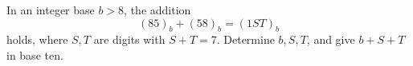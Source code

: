 In an integer base $b>8$, the addition
\[
(85)_b+(58)_b=(1ST)_b
\]
holds, where $S,T$ are digits with $S+T=7$. Determine $b,S,T$, and give $b+S+T$ in base ten.
